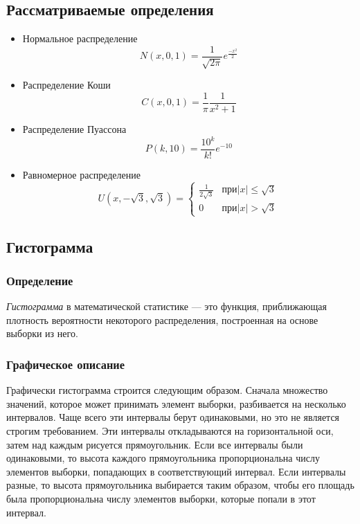 \documentclass[main.tex]{subfiles}
\begin{document}
    \subsection{Рассматриваемые определения}
\begin{itemize}
		\item Нормальное распределение
		    \begin{equation}
		    	N(x, 0, 1) = \frac{1}{\sqrt{2\pi}}e^{\frac{-x^2}{2}} \label{norm} 
			\end{equation}
		\item Распределение Коши
		    \begin{equation}
				C(x, 0, 1) = \frac{1}{\pi}\frac{1}{x^2+1} \label{koshi}
			 \end{equation} 
		\item Распределение Пуассона
	        \begin{equation}
				P(k, 10) = \frac{10^k}{k!}e^{-10}\label{puasson}
			\end{equation}
		\item Равномерное распределение 
		    \begin{equation}
				U(x, -\sqrt{3}, \sqrt{3}) =	\begin{cases}\frac{1}{2\sqrt{3}} 
				&\text{$при |x|\leq \sqrt{3}$}\\0 &\text{$при |x|>\sqrt{3}$}\end{cases}\label{uni} 
			\end{equation}
	\end{itemize}
	
	\subsection{Гистограмма}
	\subsubsection{Определение}
	\noindent \textit{Гистограмма} в математической статистике — это функция, приближающая плотность вероятности некоторого распределения, построенная на основе выборки из него.
	
	\subsubsection{Графическое описание}
	\noindent Графически гистограмма строится следующим образом. Сначала множество значений, которое может принимать элемент выборки, разбивается на несколько интервалов. Чаще всего эти интервалы берут одинаковыми, но это не является строгим требованием. Эти интервалы откладываются на горизонтальной оси, затем над каждым рисуется прямоугольник. Если все интервалы были одинаковыми, то высота каждого прямоугольника пропорциональна числу элементов выборки, попадающих в соответствующий интервал. Если интервалы разные, то высота прямоугольника выбирается таким образом, чтобы его площадь была пропорциональна числу элементов выборки, которые попали в этот интервал.
	
\end{document}
